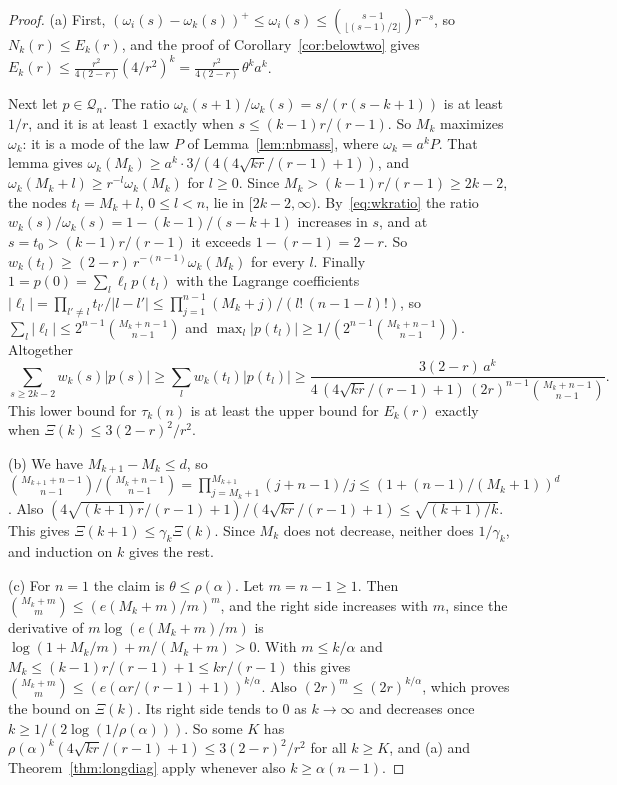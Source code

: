 \documentclass[11pt]{article}
\begin{document}
\begin{proof}
(a) First, $(\omega_i(s)-\omega_k(s))^+\le\omega_i(s)\le
\binom{s-1}{\lfloor(s-1)/2\rfloor}r^{-s}$, so $N_k(r)\le E_k(r)$, and the
proof of Corollary~\ref{cor:belowtwo} gives
$E_k(r)\le\frac{r^2}{4(2-r)}(4/r^2)^k=\frac{r^2}{4(2-r)}\,\theta^ka^k$.

Next let $p\in\mathcal Q_n$.  The ratio $\omega_k(s+1)/\omega_k(s)=s/(r(s-k+1))$
is at least $1/r$, and it is at least $1$ exactly when $s\le(k-1)r/(r-1)$.  So
$M_k$ maximizes $\omega_k$: it is a mode of the law $P$ of
Lemma~\ref{lem:nbmass}, where $\omega_k=a^kP$.  That lemma gives
$\omega_k(M_k)\ge a^k\cdot3/(4(4\sqrt{kr}/(r-1)+1))$, and
$\omega_k(M_k+l)\ge r^{-l}\omega_k(M_k)$ for $l\ge0$.  Since
$M_k>(k-1)r/(r-1)\ge2k-2$, the nodes $t_l=M_k+l$, $0\le l<n$, lie in
$[2k-2,\infty)$.  By~\eqref{eq:wkratio} the ratio $w_k(s)/\omega_k(s)=1-(k-1)/(s-k+1)$
increases in $s$, and at $s=t_0>(k-1)r/(r-1)$ it exceeds $1-(r-1)=2-r$.  So
$w_k(t_l)\ge(2-r)\,r^{-(n-1)}\omega_k(M_k)$ for every $l$.  Finally
$1=p(0)=\sum_l\ell_lp(t_l)$ with the Lagrange coefficients
$|\ell_l|=\prod_{l'\ne l}t_{l'}/|l-l'|\le\prod_{j=1}^{n-1}(M_k+j)/(l!\,(n-1-l)!)$,
so $\sum_l|\ell_l|\le2^{n-1}\binom{M_k+n-1}{n-1}$ and
$\max_l|p(t_l)|\ge1/(2^{n-1}\binom{M_k+n-1}{n-1})$.  Altogether
\[
  \sum_{s\ge2k-2}w_k(s)|p(s)|\ge\sum_lw_k(t_l)|p(t_l)|
  \ge\frac{3(2-r)\,a^k}{4\,(4\sqrt{kr}/(r-1)+1)\,(2r)^{n-1}\binom{M_k+n-1}{n-1}} .
\]
This lower bound for $\tau_k(n)$ is at least the upper bound for $E_k(r)$
exactly when $\Xi(k)\le3(2-r)^2/r^2$.

(b) We have $M_{k+1}-M_k\le d$, so
$\binom{M_{k+1}+n-1}{n-1}/\binom{M_k+n-1}{n-1}=\prod_{j=M_k+1}^{M_{k+1}}(j+n-1)/j
\le(1+(n-1)/(M_k+1))^d$.  Also
$(4\sqrt{(k+1)r}/(r-1)+1)/(4\sqrt{kr}/(r-1)+1)\le\sqrt{(k+1)/k}$.  This gives
$\Xi(k+1)\le\gamma_k\Xi(k)$.  Since $M_k$ does not decrease, neither does
$1/\gamma_k$, and induction on $k$ gives the rest.

(c) For $n=1$ the claim is $\theta\le\rho(\alpha)$.  Let $m=n-1\ge1$.  Then
$\binom{M_k+m}m\le(e(M_k+m)/m)^m$, and the right side increases with $m$,
since the derivative of $m\log(e(M_k+m)/m)$ is $\log(1+M_k/m)+m/(M_k+m)>0$.
With $m\le k/\alpha$ and $M_k\le(k-1)r/(r-1)+1\le kr/(r-1)$ this gives
$\binom{M_k+m}m\le(e(\alpha r/(r-1)+1))^{k/\alpha}$.  Also
$(2r)^m\le(2r)^{k/\alpha}$, which proves the bound on $\Xi(k)$.  Its right side
tends to $0$ as $k\to\infty$ and decreases once $k\ge1/(2\log(1/\rho(\alpha)))$.
So some $K$ has $\rho(\alpha)^k(4\sqrt{kr}/(r-1)+1)\le3(2-r)^2/r^2$ for all
$k\ge K$, and (a) and Theorem~\ref{thm:longdiag} apply whenever also
$k\ge\alpha(n-1)$.
\end{proof}
\end{document}
